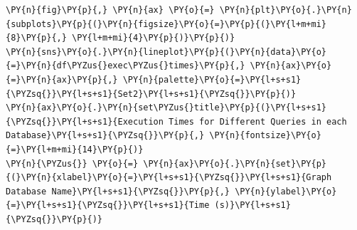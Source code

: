     

    \begin{tcolorbox}[breakable, size=fbox, boxrule=1pt, pad at break*=1mm,colback=cellbackground, colframe=cellborder]
\begin{Verbatim}[commandchars=\\\{\}]
\PY{n}{fig}\PY{p}{,} \PY{n}{ax} \PY{o}{=} \PY{n}{plt}\PY{o}{.}\PY{n}{subplots}\PY{p}{(}\PY{n}{figsize}\PY{o}{=}\PY{p}{(}\PY{l+m+mi}{8}\PY{p}{,} \PY{l+m+mi}{4}\PY{p}{)}\PY{p}{)}
\PY{n}{sns}\PY{o}{.}\PY{n}{lineplot}\PY{p}{(}\PY{n}{data}\PY{o}{=}\PY{n}{df\PYZus{}exec\PYZus{}times}\PY{p}{,} \PY{n}{ax}\PY{o}{=}\PY{n}{ax}\PY{p}{,} \PY{n}{palette}\PY{o}{=}\PY{l+s+s1}{\PYZsq{}}\PY{l+s+s1}{Set2}\PY{l+s+s1}{\PYZsq{}}\PY{p}{)}
\PY{n}{ax}\PY{o}{.}\PY{n}{set\PYZus{}title}\PY{p}{(}\PY{l+s+s1}{\PYZsq{}}\PY{l+s+s1}{Execution Times for Different Queries in each Database}\PY{l+s+s1}{\PYZsq{}}\PY{p}{,} \PY{n}{fontsize}\PY{o}{=}\PY{l+m+mi}{14}\PY{p}{)}
\PY{n}{\PYZus{}} \PY{o}{=} \PY{n}{ax}\PY{o}{.}\PY{n}{set}\PY{p}{(}\PY{n}{xlabel}\PY{o}{=}\PY{l+s+s1}{\PYZsq{}}\PY{l+s+s1}{Graph Database Name}\PY{l+s+s1}{\PYZsq{}}\PY{p}{,} \PY{n}{ylabel}\PY{o}{=}\PY{l+s+s1}{\PYZsq{}}\PY{l+s+s1}{Time (s)}\PY{l+s+s1}{\PYZsq{}}\PY{p}{)}
\end{Verbatim}
\end{tcolorbox}

    \begin{center}
    \end{center}
    { \hspace*{\fill} \\}
